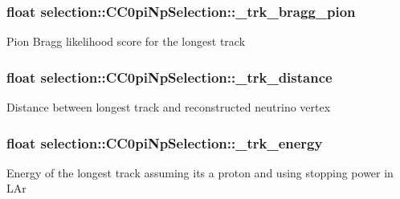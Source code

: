 \subsubsection[{\texorpdfstring{\+\_\+trk\+\_\+bragg\+\_\+pion}{_trk_bragg_pion}}]{\setlength{\rightskip}{0pt plus 5cm}float selection\+::\+C\+C0pi\+Np\+Selection\+::\+\_\+trk\+\_\+bragg\+\_\+pion\hspace{0.3cm}{\ttfamily [private]}}\hypertarget{classselection_1_1CC0piNpSelection_a5371981bb5f02024c2ba1d986541ffd9}{}\label{classselection_1_1CC0piNpSelection_a5371981bb5f02024c2ba1d986541ffd9}
Pion Bragg likelihood score for the longest track 
\subsubsection[{\texorpdfstring{\+\_\+trk\+\_\+distance}{_trk_distance}}]{\setlength{\rightskip}{0pt plus 5cm}float selection\+::\+C\+C0pi\+Np\+Selection\+::\+\_\+trk\+\_\+distance\hspace{0.3cm}{\ttfamily [private]}}\hypertarget{classselection_1_1CC0piNpSelection_a0f16777192fbed04bcc67edfdfa67e6b}{}\label{classselection_1_1CC0piNpSelection_a0f16777192fbed04bcc67edfdfa67e6b}
Distance between longest track and reconstructed neutrino vertex 
\subsubsection[{\texorpdfstring{\+\_\+trk\+\_\+energy}{_trk_energy}}]{\setlength{\rightskip}{0pt plus 5cm}float selection\+::\+C\+C0pi\+Np\+Selection\+::\+\_\+trk\+\_\+energy\hspace{0.3cm}{\ttfamily [private]}}\hypertarget{classselection_1_1CC0piNpSelection_a98e03f33f34b5df397a1d1144b1de4a1}{}\label{classselection_1_1CC0piNpSelection_a98e03f33f34b5df397a1d1144b1de4a1}
Energy of the longest track assuming it\textquotesingle{}s a proton and using stopping power in L\+Ar 
